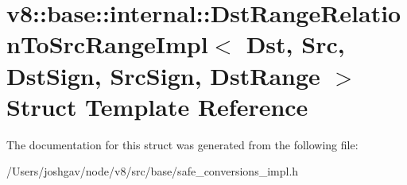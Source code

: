 \hypertarget{structv8_1_1base_1_1internal_1_1_dst_range_relation_to_src_range_impl}{}\section{v8\+:\+:base\+:\+:internal\+:\+:Dst\+Range\+Relation\+To\+Src\+Range\+Impl$<$ Dst, Src, Dst\+Sign, Src\+Sign, Dst\+Range $>$ Struct Template Reference}
\label{structv8_1_1base_1_1internal_1_1_dst_range_relation_to_src_range_impl}


The documentation for this struct was generated from the following file\+:\begin{DoxyCompactItemize}
\item 
/\+Users/joshgav/node/v8/src/base/safe\+\_\+conversions\+\_\+impl.\+h\end{DoxyCompactItemize}
